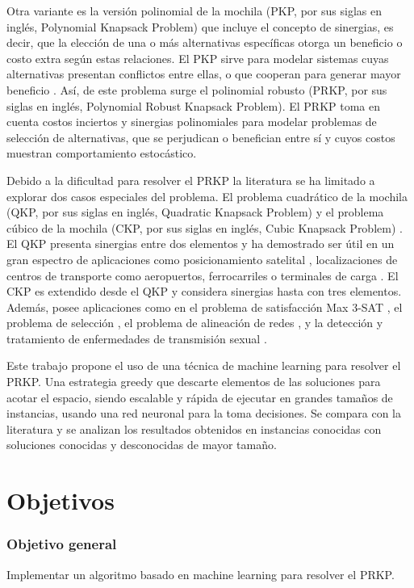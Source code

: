 \documentclass[spanish, a4paper, 12pt, openany,final]{book}
\begin{document}
Otra variante es la versión polinomial de la mochila (PKP, por sus siglas en inglés, Polynomial Knapsack Problem) que incluye el concepto de sinergias, es decir, que la elección de una o más alternativas específicas otorga un beneficio o costo extra según estas relaciones. El PKP sirve para modelar sistemas cuyas alternativas presentan conflictos entre ellas, o que cooperan para generar mayor beneficio \citep{baldo_polynomial_2023}. Así, de este problema surge el polinomial robusto (PRKP, por sus siglas en inglés, Polynomial Robust Knapsack Problem). El PRKP toma en cuenta costos inciertos y sinergias polinomiales para modelar problemas de selección de alternativas, que se perjudican o benefician entre sí y cuyos costos muestran comportamiento estocástico.

Debido a la dificultad para resolver el PRKP la literatura se ha limitado a explorar dos casos especiales del problema. El problema cuadrático de la mochila (QKP, por sus siglas en inglés, Quadratic Knapsack Problem) \citep{gallo_quadratic_1980} y el problema cúbico de la mochila (CKP, por sus siglas en inglés, Cubic Knapsack Problem) \citep{forrester_strengthening_2022}. El QKP presenta sinergias entre dos elementos y ha demostrado ser útil en un gran espectro de aplicaciones como posicionamiento satelital \citep{witzgall_mathematical_1975}, localizaciones de centros de transporte como aeropuertos, ferrocarriles o terminales de carga \citep{rhys_selection_1970}. El CKP es extendido desde el QKP y considera sinergias hasta con tres elementos. Además, posee aplicaciones como en el problema de satisfacción Max 3-SAT \citep{kofler_penalty_2014}, el problema de selección \citep{gallo_fast_1989}, el problema de alineación de redes \citep{mohammadi_triangular_2017}, y la detección y tratamiento de enfermedades de transmisión sexual \citep{zhao_treatments_2008}.

Este trabajo propone el uso de una técnica de machine learning para resolver el PRKP. Una estrategia greedy que descarte elementos de las soluciones para acotar el espacio, siendo escalable y rápida de ejecutar en grandes tamaños de instancias, usando una red neuronal para la toma decisiones. Se compara con la literatura y se analizan los resultados obtenidos en instancias conocidas con soluciones conocidas y desconocidas de mayor tamaño.

\section{Objetivos}
\subsubsection*{Objetivo general}
Implementar un algoritmo basado en machine learning para resolver el PRKP.
\end{document}
